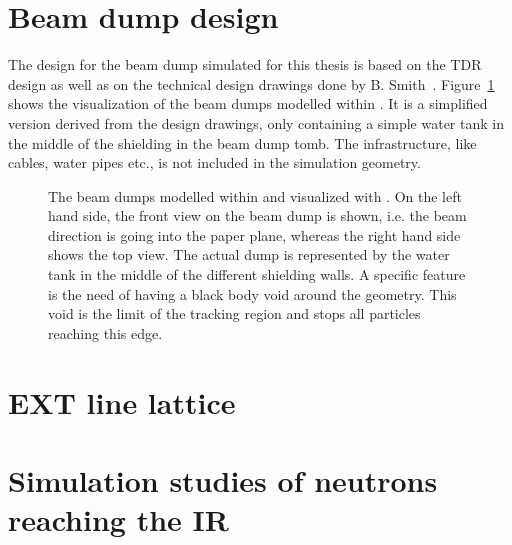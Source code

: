 \section{Beam dump design}
\label{BeamDumps:design}
The design for the beam dump simulated for this thesis is based on the TDR design as well as on the technical design drawings done by B. Smith~\cite{Smith_drawings}.
Figure~\ref{fig:BeamDumps:geometry} shows the visualization of the beam dumps modelled within \fluka. It is a simplified version derived from the design drawings, only containing a simple water tank in the middle of the shielding in the beam dump tomb. The infrastructure, like cables, water pipes etc., is not included in the simulation geometry.

\begin{figure}
\begin{center}
\caption[Geometry of the simulated beam dumps.]{The beam dumps modelled within \fluka and visualized with \flair. On the left hand side, the front view on the beam dump is shown, i.e. the beam direction is going into the paper plane, whereas the right hand side shows the top view. The actual dump is represented by the water tank in the middle of the different shielding walls. A \fluka specific feature is the need of having a black body void around the geometry. This void is the limit of the tracking region and stops all particles reaching this edge.}
\label{fig:BeamDumps:geometry}
\end{center}
\end{figure}


\section{EXT line lattice}
\label{BeamDumps:lattice}
\section{Simulation studies of neutrons reaching the IR}
\label{BeamDumps:simulation}
